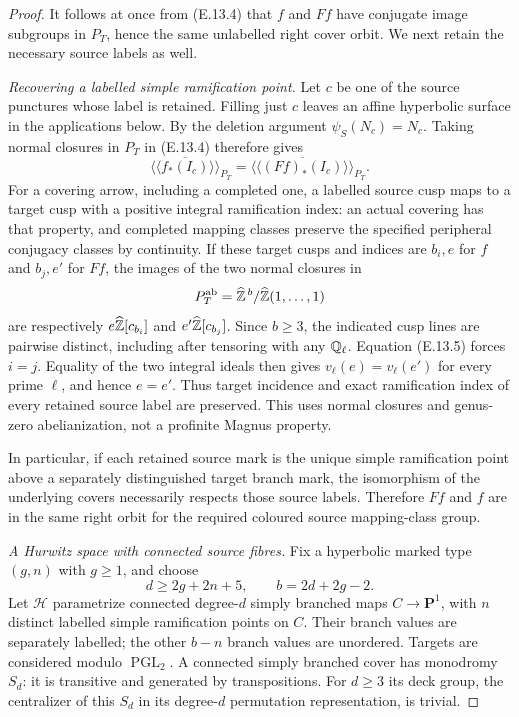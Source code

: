 \begin{proof}
It follows at once from (E.13.4) that $f$ and $Ff$ have conjugate
image subgroups in $P_T$, hence the same unlabelled right cover orbit.
We next retain the necessary source labels as well.

\emph{Recovering a labelled simple ramification point.}
Let $c$ be one of the source punctures whose label is retained. Filling
just $c$ leaves an affine hyperbolic surface in the applications below.
By the deletion argument $\psi_S(N_c)=N_c$. Taking normal closures
in $P_T$ in (E.13.4) therefore gives
\[
 \overline{\langle\!\langle f_*(I_c)\rangle\!\rangle}_{P_T}
 =
 \overline{\langle\!\langle (Ff)_*(I_c)\rangle\!\rangle}_{P_T}.
                                                               \tag{E.13.5}
\]
For a covering arrow, including a completed one, a labelled source
cusp maps to a target cusp with a positive integral ramification index:
an actual covering has that property, and completed mapping classes
preserve the specified peripheral conjugacy classes by continuity.
If these target cusps and indices are $b_i,e$ for $f$ and $b_j,e'$
for $Ff$, the images of the two normal closures in
\[
P_T^{\rm ab}=\widehat{\mathbb Z}^{\,b}/
                 \widehat{\mathbb Z}(1,\ldots,1)
\]
are respectively $e\widehat{\mathbb Z}[c_{b_i}]$ and
$e'\widehat{\mathbb Z}[c_{b_j}]$. Since $b\ge3$, the indicated cusp lines
are pairwise distinct, including after tensoring with any $\mathbb Q_\ell$.
Equation (E.13.5) forces $i=j$. Equality of the two integral ideals
then gives $v_\ell(e)=v_\ell(e')$ for every prime $\ell$, and hence
$e=e'$. Thus target incidence and exact ramification index of every
retained source label are preserved. This uses normal closures and
genus-zero abelianization, not a profinite Magnus property.

In particular, if each retained source mark is the unique simple
ramification point above a separately distinguished target branch mark,
the isomorphism of the underlying covers necessarily respects those
source labels. Therefore $Ff$ and $f$ are in the same right orbit for
the required coloured source mapping-class group.

\emph{A Hurwitz space with connected source fibres.}
Fix a hyperbolic marked type $(g,n)$ with $g\ge1$, and choose
\[
                 d\ge2g+2n+5,\qquad b=2d+2g-2.
\]
Let $\mathcal H$ parametrize connected degree-$d$ simply branched
maps $C\to\mathbf P^1$, with $n$ distinct labelled simple
ramification points on $C$. Their branch values are separately labelled;
the other $b-n$ branch values are unordered. Targets are considered
modulo $\operatorname{PGL}_2$. A connected simply branched cover has
monodromy $S_d$: it is transitive and generated by transpositions.
For $d\ge3$ its deck group, the centralizer of this $S_d$ in its
degree-$d$ permutation representation, is trivial.


\end{proof}
